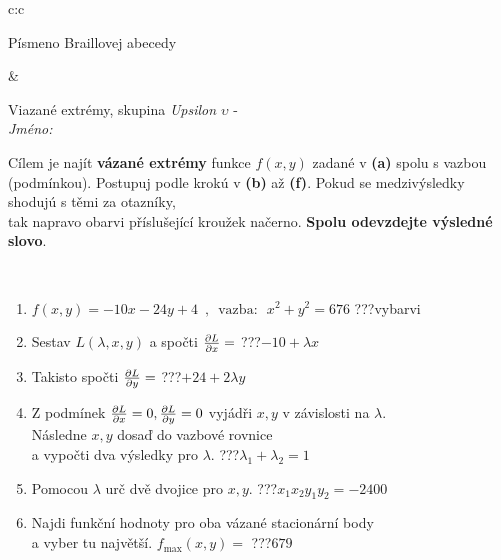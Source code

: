 \documentclass[10pt]{report}
\begin{document}
\begin{tabular}{c:c}
\begin{minipage}[c][104.5mm][t]{0.5\linewidth}
\begin{center}
\begin{minipage}{0.20\linewidth}
\begin{center}
{\small Písmeno Braillovej abecedy}
\end{center}
\end{minipage}
\end{center}
\end{minipage}
&
\begin{minipage}[c][104.5mm][t]{0.5\linewidth}
\begin{center}
\vspace{7mm}
{\huge Viazané extrémy, skupina \textit{Upsilon $\upsilon$} -}\\[5mm]
\textit{Jméno:}\phantom{xxxxxxxxxxxxxxxxxxxxxxxxxxxxxxxxxxxxxxxxxxxxxxxxxxxxxxxxxxxxxxxxx}\\[5mm]
\begin{minipage}{0.95\linewidth}
\begin{center}
Cílem je najít \textbf{vázané extrémy} funkce $f(x,y)$ zadané v \textbf{(a)} spolu s vazbou (podmínkou). Postupuj podle krokú v \textbf{(b)} až \textbf{(f)}. Pokud se medzivýsledky shodujú s těmi za otazníky,\\tak napravo obarvi příslušející kroužek načerno. \textbf{Spolu odevzdejte výsledné slovo}.
\end{center}
\end{minipage}
\\[1mm]
\begin{minipage}{0.79\linewidth}
\begin{center}
\begin{varwidth}{\linewidth}
\begin{enumerate}
\normalsize
\item $f(x,y)=-10x-24y+4 \enspace , \enspace \mathrm{vazba:} \enspace x^2+y^2=676$\quad \dotfill\; ???\;\dotfill \quad vybarvi
\item Sestav $L(\lambda,x,y)$ a spočti $\pdv{L}{x}=$\quad \dotfill\; ???\;\dotfill \quad $-10+\lambda x$
\item Takisto spočti $\pdv{L}{y}=$\quad \dotfill\; ???\;\dotfill \quad $+24+2\lambda y$
\item Z podmínek $\pdv{L}{x}=0 , \pdv{L}{y}=0$ vyjádři $x,y$ v závislosti na $\lambda$.\\ \phantom{xxxxxx}Následne $x,y$ dosaď do vazbové rovnice\\ \phantom{xxxxxx}a vypočti dva výsledky pro $\lambda$.\quad \dotfill\; ???\;\dotfill \quad $\lambda_1+\lambda_2=1$
\item Pomocou $\lambda$ urč dvě dvojice pro $x,y$.\quad \dotfill\; ???\;\dotfill \quad $x_1 x_2 y_1 y_2=-2400$
\item Najdi funkční hodnoty pro oba vázané stacionární body\\ \phantom{xxxxxx}a vyber tu najvětší. $f_{\text{max}}(x,y)=$\quad \dotfill\; ???\;\dotfill \quad $679$

\end{enumerate}
\end{varwidth}
\end{center}
\end{minipage}
\end{center}
\end{minipage}
\end{tabular}
\end{document}
